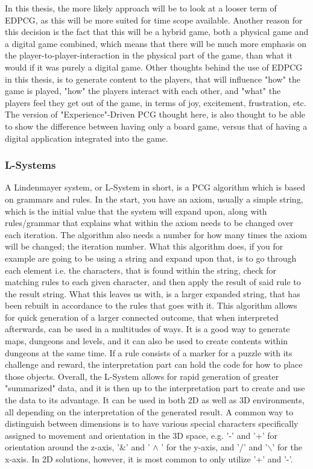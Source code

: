 In this thesis, the more likely approach will be to look at a looser term of EDPCG, as this will be more suited for time scope available.
Another reason for this decision is the fact that this will be a hybrid game, both a physical game and a digital game combined, which means that there will be much more emphasis on the player-to-player-interaction in the physical part of the game, than what it would if it was purely a digital game. Other thoughts behind the use of EDPCG in this thesis, is to generate content to the players, that will influence "how" the game is played, "how" the players interact with each other, and "what" the players feel they get out of the game, in terms of joy, excitement, frustration, etc. 
The version of "Experience"-Driven PCG thought here, is also thought to be able to show the difference between having only a board game, versus that of having a digital application integrated into the game.

\subsubsection{L-Systems}
A Lindenmayer system, or L-System in short, is a PCG algorithm which is based on grammars and rules. In the start, you have an axiom, usually a simple string, which is the initial value that the system will expand upon, along with rules/grammar that explains what within the axiom needs to be changed over each iteration. The algorithm also needs a number for how many times the axiom will be changed; the iteration number. What this algorithm does, if you for example are going to be using a string and expand upon that, is to go through each element i.e. the characters, that is found within the string, check for matching rules to each given character, and then apply the result of said rule to the result string.
What this leaves us with, is a larger expanded string, that has been rebuilt in accordance to the rules that goes with it. This algorithm allows for quick generation of a larger connected outcome, that when interpreted afterwards, can be used in a multitudes of ways. It is a good way to generate maps, dungeons and levels, and it can also be used to create contents within dungeons at the same time. If a rule consists of a marker for a puzzle with its challenge and reward, the interpretation part can hold the code for how to place those objects. 
Overall, the L-System allows for rapid generation of greater "summarized" data, and it is then up to the interpretation part to create and use the data to its advantage.
It can be used in both 2D as well as 3D environments, all depending on the interpretation of the generated result. A common way to distinguish between dimensions is to have various special characters specifically assigned to movement and orientation in the 3D space, e.g. '-' and '+' for orientation around the z-axis, '$\&$' and ' $\wedge$ ' for the y-axis, and '/' and '$\backslash$' for the x-axis. In 2D solutions, however, it is most common to only utilize '+' and '-'. 

